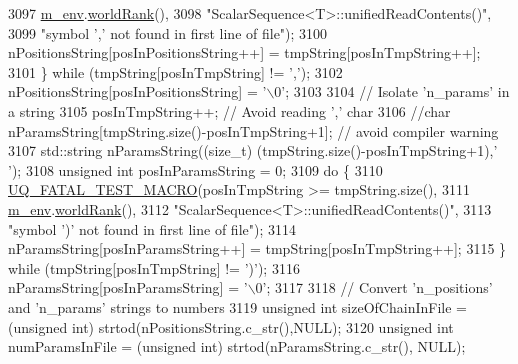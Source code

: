 \begin{DoxyCode}
3097                                     \hyperlink{class_q_u_e_s_o_1_1_scalar_sequence_a71618cd6351b29361b437af68447a4c8}{m\_env}.\hyperlink{class_q_u_e_s_o_1_1_base_environment_a78b57112bbd0e6dd0e8afec00b40ffa7}{worldRank}(),
3098                                     \textcolor{stringliteral}{"ScalarSequence<T>::unifiedReadContents()"},
3099                                     \textcolor{stringliteral}{"symbol ',' not found in first line of file"});
3100                 nPositionsString[posInPositionsString++] = tmpString[posInTmpString++];
3101               \} \textcolor{keywordflow}{while} (tmpString[posInTmpString] != \textcolor{charliteral}{','});
3102               nPositionsString[posInPositionsString] = \textcolor{charliteral}{'\(\backslash\)0'};
3103 
3104               \textcolor{comment}{// Isolate 'n\_params' in a string}
3105               posInTmpString++; \textcolor{comment}{// Avoid reading ',' char}
3106               \textcolor{comment}{//char nParamsString[tmpString.size()-posInTmpString+1]; // avoid compiler warning}
3107         std::string nParamsString((\textcolor{keywordtype}{size\_t}) (tmpString.size()-posInTmpString+1),\textcolor{charliteral}{' '});
3108               \textcolor{keywordtype}{unsigned} \textcolor{keywordtype}{int} posInParamsString = 0;
3109               \textcolor{keywordflow}{do} \{
3110                 \hyperlink{_defines_8h_a56d63d18d0a6d45757de47fcc06f574d}{UQ\_FATAL\_TEST\_MACRO}(posInTmpString >= tmpString.size(),
3111                                     \hyperlink{class_q_u_e_s_o_1_1_scalar_sequence_a71618cd6351b29361b437af68447a4c8}{m\_env}.\hyperlink{class_q_u_e_s_o_1_1_base_environment_a78b57112bbd0e6dd0e8afec00b40ffa7}{worldRank}(),
3112                                     \textcolor{stringliteral}{"ScalarSequence<T>::unifiedReadContents()"},
3113                                     \textcolor{stringliteral}{"symbol ')' not found in first line of file"});
3114                 nParamsString[posInParamsString++] = tmpString[posInTmpString++];
3115               \} \textcolor{keywordflow}{while} (tmpString[posInTmpString] != \textcolor{charliteral}{')'});
3116               nParamsString[posInParamsString] = \textcolor{charliteral}{'\(\backslash\)0'};
3117 
3118               \textcolor{comment}{// Convert 'n\_positions' and 'n\_params' strings to numbers}
3119               \textcolor{keywordtype}{unsigned} \textcolor{keywordtype}{int} sizeOfChainInFile = (\textcolor{keywordtype}{unsigned} int) strtod(nPositionsString.c\_str(),NULL);
3120               \textcolor{keywordtype}{unsigned} \textcolor{keywordtype}{int} numParamsInFile   = (\textcolor{keywordtype}{unsigned} int) strtod(nParamsString.c\_str(),   NULL);

\end{DoxyCode}
